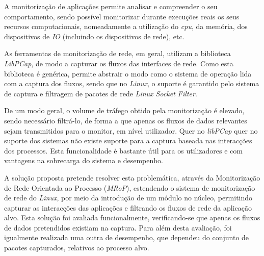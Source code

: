 \resumo 

A monitorização de aplicações permite analisar e compreender o seu comportamento, sendo possível monitorizar durante execuções reais os seus recursos computacionais, nomeadamente a utilização do \textit{cpu}, da memória, dos dispositivos de \textit{IO} (incluindo os dispositivos de rede), etc. 

As ferramentas de monitorização de rede, em geral, utilizam a biblioteca \textit{LibPCap}, de modo a capturar os fluxos das interfaces de rede.
Como esta biblioteca é genérica, permite abstrair o modo como o sistema de operação lida com a captura dos fluxos, sendo que no \textit{Linux}, o suporte é garantido pelo sistema de captura e filtragem de pacotes de rede \textit{Linux Socket Filter}.


De um modo geral, o volume de tráfego obtido pela monitorização é elevado, sendo necessário filtrá-lo, de forma a que apenas os fluxos de dados relevantes sejam transmitidos para o monitor, em nível utilizador.
Quer no \textit{libPCap} quer no suporte dos sistemas não existe suporte para a captura baseada nas interacções dos processos.
Esta funcionalidade é bastante útil para os utilizadores e com vantagens na sobrecarga do sistema e desempenho.

A solução proposta pretende resolver esta problemática, através da Monitorização de Rede Orientada ao Processo (\textit{MRoP}), estendendo o sistema de monitorização de rede do \textit{Linux}, por meio da introdução de um módulo no núcleo, permitindo capturar as interacções das aplicações e filtrando os fluxos de rede da aplicação alvo.
Esta solução foi avaliada funcionalmente, verificando-se que apenas os fluxos de dados pretendidos existiam na captura.
Para além desta avaliação, foi igualmente realizada uma outra de desempenho, que dependeu do conjunto de pacotes capturados, relativos ao processo alvo.






